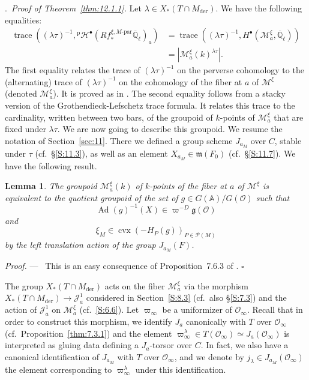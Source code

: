 \documentclass[12pt,a4paper,oneside,english,leqno]{smfart}
\makeatletter
\numberwithin{equation}{subsection}
\newcounter{theo}
\numberwithin{theo}{subsection}
\newenvironment{paragr}[1][]{\medskip\refstepcounter{subsection}%
  \par\noindent\hspace*{\parindent}\thesubsection.\ \emph{#1}%
  \@ifundefined{@empty}{}{}\ignorespaces}{\medskip}
\theoremstyle{plain}
\newtheorem{lemma}[theo]{Lemma}
\theoremstyle{definition}
\theoremstyle{remark}
\newenvironment{preuve}[1][]{\medskip\noindent\textit{Proof.} #1 ---\ }%
  {\hfill\ensuremath{\square}\medskip}
\DeclareMathOperator{\Ad}{Ad}
\DeclareMathOperator{\der}{der}
\DeclareMathOperator{\trace}{trace}
\newcommand{\AAA}{\mathbb{A}}
\newcommand{\Qlb}{\overline{\mathbb{Q}}_{\ell}}
\newcommand{\oc}{\mathcal{O}}
\newcommand{\mc}{\mathcal{M}}
\newcommand{\pc}{\mathcal{P}}
\newcommand{\hc}{\mathcal{H}}
\newcommand{\Jc}{\mathcal{J}}
\newcommand{\ggo}{\mathfrak{g}}
\newcommand{\mgo}{\mathfrak{m}}
\newcommand{\la}{\lambda}
\makeatother
\begin{document}
\begin{paragr}[Proof of Theorem~\ref{thm:12.1.1}.]
Let $\la\in X_*(T\cap M_{\der})$. We have the following equalities:
\begin{equation}\label{eq:12.3.2}
\begin{split}
\trace((\la\tau)^{-1},{}^{\mathrm p}\hc^\bullet(Rf_*^{\xi,M\text{-par}}\Qlb)_a)
&=\trace((\la\tau)^{-1},H^\bullet(\mc_a^\xi,\Qlb))\\
&=|\mc_a^\xi(k)^{\la\tau}|.
\end{split}
\end{equation}
The first equality relates the trace of $(\la\tau)^{-1}$ on the perverse cohomology to the (alternating) trace of $(\la\tau)^{-1}$ on the cohomology of the fiber at $a$ of $\mc^\xi$ (denoted $\mc_a^\xi$). It is proved as in \cite[Lemma~3.10.1]{Laumon-Ngo}. The second equality follows from a stacky version of the Grothendieck-Lefschetz trace formula. It relates this trace to the cardinality, written between two bars, of the groupoid of $k$-points of $\mc_a^\xi$ that are fixed under $\la\tau$. We are now going to describe this groupoid. We resume the notation of Section~\ref{sec:11}. There we defined a group scheme $J_{a_M}$ over $C$, stable under $\tau$ (cf.\ \S\ref{S:11.3}), as well as an element $X_{a_M}\in\mgo(F_0)$ (cf.\ \S\ref{S:11.7}). We have the following result.

\begin{lemma}\label{thm:12.3.1}
The groupoid $\mc_a^\xi(k)$ of $k$-points of the fiber at $a$ of $\mc^\xi$ is equivalent to the quotient groupoid of the set of $g\in G(\AAA)/G(\oc)$ such that
\begin{equation}\label{eq:12.3.3}
\Ad(g)^{-1}(X)\in\varpi^{-D}\ggo(\oc)
\end{equation}
and
\begin{equation}\label{eq:12.3.4}
\xi_M\in\operatorname{cvx}(-H_P(g))_{P\in\pc(M)}
\end{equation}
by the left translation action of the group $J_{a_M}(F)$.
\end{lemma}

\begin{preuve}
This is an easy consequence of Proposition~7.6.3 of \cite{LFPI}.
\end{preuve}

The group $X_*(T\cap M_{\der})$ acts on the fiber $\mc_a^\xi$ via the morphism $X_*(T\cap M_{\der})\to\Jc_a^1$ considered in Section~\ref{S:8.3} (cf.\ also \S\ref{S:7.3}) and the action of $\Jc_a^1$ on $\mc_a^\xi$ (cf.\ \ref{S:6.6}). Let $\varpi_\infty$ be a uniformizer of $\oc_\infty$. Recall that in order to construct this morphism, we identify $J_a$ canonically with $T$ over $\oc_\infty$ (cf.\ Proposition~\ref{thm:7.3.1}) and the element $\varpi_\infty^\la\in T(\oc_\infty)\simeq J_a(\oc_\infty)$ is interpreted as gluing data defining a $J_a$-torsor over $C$. In fact, we also have a canonical identification of $J_{a_M}$ with $T$ over $\oc_\infty$, and we denote by $j_\la\in J_{a_M}(\oc_\infty)$ the element corresponding to $\varpi_\infty^\la$ under this identification.


\end{paragr}
\end{document}
